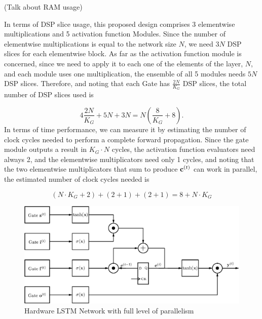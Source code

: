 (Talk about RAM usage)

In terms of DSP slice usage, this proposed design comprises 3 elementwise multiplications and 5 activation function Modules. Since the number of elementwise multiplications is equal to the network size $N$, we need $3N$ DSP slices for each elementwise block. As far as the activation function module is concerned, since we need to apply it to each one of the elements of the layer, $N$, and each module uses one multiplication, the ensemble of all 5 modules needs $5N$ DSP slices. Therefore, and noting that each Gate has $\frac{2N}{K_G}$ DSP slices, the total number of DSP slices used is

\begin{equation}\label{eq:numdsp_network}
    4\frac{2N}{K_G} + 5N + 3N = N \left( \frac{8}{K_G} + 8 \right).
\end{equation}
In terms of time performance, we can measure it by estimating the number of clock cycles needed to perform a complete forward propagation. Since the gate module outputs a result in $K_G \cdot N$ cycles, the activation function evaluators need always 2, and the elementwise multiplicators need only 1 cycles, and noting that the two elementwise multiplicators that sum to produce $\mathbf{c}^{(t)}$ can work in parallel, the estimated number of clock cycles needed is

\begin{equation}\label{eq:numcc_network}
    (N \cdot K_G + 2) + (2 + 1) + (2 + 1) = 8 + N\cdot K_G
\end{equation}

\begin{figure}
    \centering
    \includegraphics[width=0.9\linewidth]{figures/network.eps}
    \caption[Hardware LSTM Network with full level of parallelism]{Hardware LSTM Network with full level of parallelism}
    \label{fig:network}
\end{figure}

